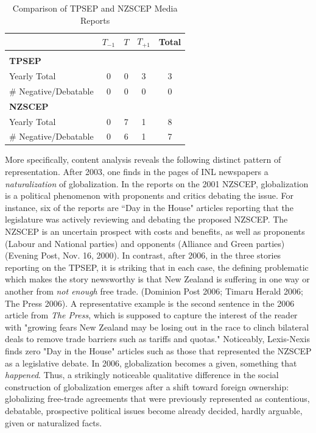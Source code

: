 \documentclass[12pt]{report}
\begin{document}
\begin{center}
\begin{table}[htdp]
\caption{Comparison of TPSEP and NZSCEP Media Reports}
\vspace{2em}
\begin{center}
{\scriptsize
\begin{tabular}{lcccc} \hline & $T_{-1}$ &  $T$ &  $T_{+1}$ &
Total \\ \hline &  &  &
 \\ \bf{TPSEP} & & & &\\ Yearly Total & 0 & 0 & 3 & 3\\ \#
Negative/Debatable & 0 & 0 & 0 & 0  \\ \bf{NZSCEP} & & & & \\ Yearly Total & 0 & 7 & 1 &
8\\ \# Negative/Debatable & 0 & 6 & 1 & 7 \vspace{10pt}\\
\end{tabular}
}
\end{center}
\label{default}
\end{table}
\end{center}


More specifically, content analysis reveals the following distinct pattern of representation. After
2003, one finds in the pages of INL newspapers a \emph{naturalization} of globalization. In the
reports on the 2001 NZSCEP, globalization is a political phenomenon with proponents and critics
debating the issue. For instance, six of the reports are ``Day in the House" articles reporting that
the legislature was actively reviewing and debating the proposed NZSCEP. The NZSCEP is an uncertain
prospect with costs and benefits, as well as proponents (Labour and National parties) and opponents
(Alliance and Green parties) (Evening Post, Nov. 16, 2000). In contrast, after 2006, in the three
stories reporting on the TPSEP, it is striking that in each case, the defining problematic which
makes the story newsworthy is that New Zealand is suffering in one way or another from \emph{not
enough} free trade. (Dominion Post 2006; Timaru Herald 2006; The Press 2006). A representative
example is the second sentence in the 2006 article from \emph{The Press}, which is supposed to
capture the interest of the reader with "growing fears New Zealand may be losing out in the race to
clinch bilateral deals to remove trade barriers such as tariffs and quotas." Noticeably, Lexis-Nexis
finds zero "Day in the House" articles such as those that represented the NZSCEP as a legislative
debate. In 2006, globalization becomes a given, something that \emph{happened}. Thus, a strikingly
noticeable qualitative difference in the social construction of globalization emerges after a shift
toward foreign ownership: globalizing free-trade agreements that were previously represented as
contentious, debatable, prospective political issues become already decided, hardly arguable, given
or naturalized facts.
\end{document}
